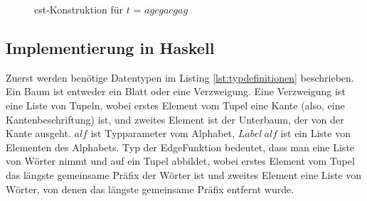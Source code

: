 \documentclass[12pt]{report}
\begin{document}
\begin{figure}[h]
\caption{cst-Konstruktion für $t$ = $agcgacgag$}
\label{fig:cstKonstruktion}
\end{figure}

\subsection{Implementierung in Haskell}
\label{sec:ImplementierungInHaskell}

Zuerst werden benötige Datentypen im Listing \ref{lst:typdefinitionen} beschrieben. Ein Baum ist entweder ein Blatt oder eine Verzweigung. Eine Verzweigung ist eine Liste von Tupeln, wobei erstes Element vom Tupel eine Kante (also, eine Kantenbeschriftung) ist, und zweites Element ist der Unterbaum, der von der Kante ausgeht. $alf$ ist Typparameter vom Alphabet, $Label\:alf$ ist ein Liste von Elementen des Alphabets.
Typ der EdgeFunktion bedeutet, dass man eine Liste von Wörter nimmt und auf ein Tupel abbildet, wobei erstes Element vom Tupel das längste gemeinsame Präfix der Wörter ist und zweites Element eine Liste von Wörter, von denen das längste gemeinsame Präfix entfernt wurde.
\end{document}
